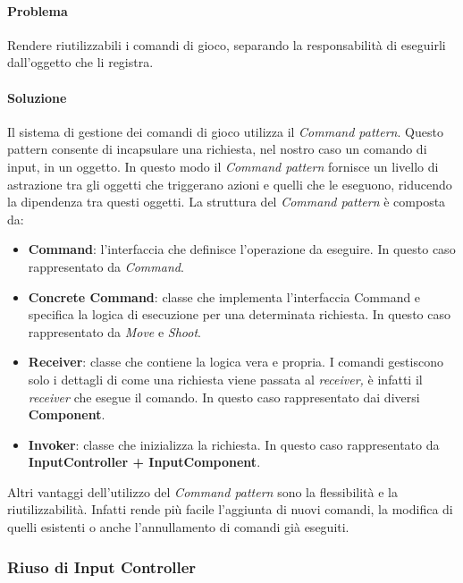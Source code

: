 \documentclass[a4paper,12pt]{report}
\begin{document}
\paragraph{Problema} Rendere riutilizzabili i comandi di gioco, separando la responsabilità di eseguirli dall’oggetto che li registra.

\paragraph{Soluzione} Il sistema di gestione dei comandi di gioco utilizza il \textit{Command pattern}. 
Questo pattern consente di incapsulare una richiesta, nel nostro caso un comando di input, in un oggetto. 
In questo modo il \textit{Command pattern} fornisce un livello di astrazione tra gli oggetti che triggerano azioni e quelli che le eseguono, 
riducendo la dipendenza tra questi oggetti.
La struttura del \textit{Command pattern} è composta da:
\begin{itemize}
\item \textbf{Command}: l'interfaccia che definisce l'operazione da eseguire. In questo caso rappresentato da \textit{Command}.
\item \textbf{Concrete Command}: classe che implementa l'interfaccia Command e specifica la logica di esecuzione per una determinata richiesta. In questo caso rappresentato da \textit{Move} e \textit{Shoot}.
\item \textbf{Receiver}: classe che contiene la logica vera e propria. I comandi gestiscono solo i dettagli di come una richiesta viene passata al \textit{receiver,} è infatti il \textit{receiver} che esegue il comando. In questo caso rappresentato dai diversi \textbf{Component}.
\item \textbf{Invoker}: classe che inizializza la richiesta. In questo caso rappresentato da \textbf{InputController + InputComponent}.
\end{itemize}
Altri vantaggi dell’utilizzo del \textit{Command pattern} sono la flessibilità e la riutilizzabilità. Infatti rende più facile l’aggiunta di nuovi comandi, la modifica di quelli esistenti o anche l’annullamento di comandi già eseguiti.

\subsubsection{Riuso di Input Controller}
\end{document}
